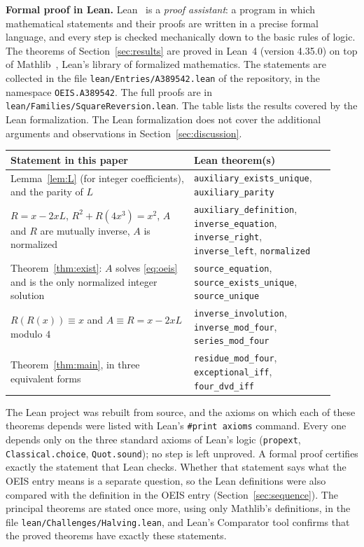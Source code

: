 \documentclass[11pt,a4paper]{article}
\theoremstyle{definition}
\theoremstyle{remark}
\newcommand{\para}[1]{\par\medskip\noindent\textbf{#1}\enspace}
\begin{document}
\para{Formal proof in Lean.}
Lean~\cite{lean} is a \emph{proof assistant}: a program in which mathematical statements and their proofs are written
in a precise formal language, and every step is checked mechanically down to the basic rules of logic. The theorems of Section~\ref{sec:results} are proved in Lean~4 (version 4.35.0) on top of
Mathlib~\cite{mathlib}, Lean's library of formalized mathematics. The statements are collected in the file \texttt{lean/Entries/A389542.lean} of the repository,
in the namespace \texttt{OEIS.A389542}. The full proofs are in \texttt{lean/Families/SquareReversion.lean}.
The table lists the results covered by the Lean formalization. The Lean formalization does not cover the additional arguments and observations in Section~\ref{sec:discussion}.
\begin{center}\small\renewcommand{\arraystretch}{1.25}
\begin{tabular}{>{\raggedright\arraybackslash}p{0.52\linewidth}>{\raggedright\arraybackslash}p{0.4\linewidth}}
\toprule
Statement in this paper & Lean theorem(s)\\
\midrule
Lemma~\ref{lem:L} (for integer coefficients), and the parity of $L$ & \texttt{auxiliary\_\allowbreak{}exists\_\allowbreak{}unique}, \texttt{auxiliary\_\allowbreak{}parity} \\
$R=x-2xL$, $R^2+R(4x^3)=x^2$, $A$ and $R$ are mutually inverse, $A$ is normalized & \texttt{auxiliary\_\allowbreak{}definition}, \texttt{inverse\_\allowbreak{}equation}, \texttt{inverse\_\allowbreak{}right}, \texttt{inverse\_\allowbreak{}left}, \texttt{normalized} \\
Theorem~\ref{thm:exist}: $A$ solves \eqref{eq:oeis} and is the only normalized integer solution & \texttt{source\_\allowbreak{}equation}, \texttt{source\_\allowbreak{}exists\_\allowbreak{}unique}, \texttt{source\_\allowbreak{}unique} \\
$R(R(x))\equiv x$ and $A\equiv R=x-2xL$ modulo $4$ & \texttt{inverse\_\allowbreak{}involution}, \texttt{inverse\_\allowbreak{}mod\_\allowbreak{}four}, \texttt{series\_\allowbreak{}mod\_\allowbreak{}four} \\
Theorem~\ref{thm:main}, in three equivalent forms & \texttt{residue\_\allowbreak{}mod\_\allowbreak{}four}, \texttt{exceptional\_\allowbreak{}iff}, \texttt{four\_\allowbreak{}dvd\_\allowbreak{}iff} \\
\bottomrule
\end{tabular}
\end{center}
The Lean project was rebuilt from source, and the axioms on which each of these theorems depends were listed with
Lean's \texttt{\#print axioms} command. Every one depends only on the three standard axioms of Lean's logic
(\texttt{propext}, \texttt{Classical.choice}, \texttt{Quot.sound}); no step is left unproved. A formal proof certifies
exactly the statement that Lean checks. Whether that statement says what the OEIS entry means is a separate question,
so the Lean definitions were also compared with the definition in the OEIS entry
(Section~\ref{sec:sequence}). The principal theorems are stated once more, using only Mathlib's definitions, in the
file \texttt{lean/Challenges/Halving.lean}, and Lean's Comparator tool confirms that the
proved theorems have exactly these statements.
\end{document}
